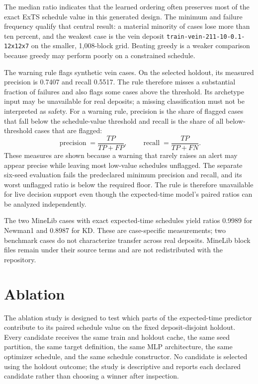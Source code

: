 \documentclass[11pt]{article}
\begin{document}
The median ratio indicates that the learned ordering often preserves most of the exact ExTS schedule value in this generated design. The minimum and failure frequency qualify that central result: a material minority of cases lose more than ten percent, and the weakest case is the vein deposit \texttt{train-vein-211-10-0.1-12x12x7} on the smaller, 1,008-block grid. Beating greedy is a weaker comparison because greedy may perform poorly on a constrained schedule.

The warning rule flags synthetic vein cases. On the selected holdout, its measured precision is 0.7407 and recall 0.5517. The rule therefore misses a substantial fraction of failures and also flags some cases above the threshold. Its archetype input may be unavailable for real deposits; a missing classification must not be interpreted as safety. For a warning rule, precision is the share of flagged cases that fall below the schedule-value threshold and recall is the share of all below-threshold cases that are flagged:
\begin{equation}
\operatorname{precision}=\frac{TP}{TP+FP},\qquad
\operatorname{recall}=\frac{TP}{TP+FN}.
\label{eq:warning-metrics}
\end{equation}
These measures are shown because a warning that rarely raises an alert may appear precise while leaving most low-value schedules unflagged. The separate six-seed evaluation fails the predeclared minimum precision and recall, and its worst unflagged ratio is below the required floor. The rule is therefore unavailable for live decision support even though the expected-time model's paired ratios can be analyzed independently.

The two MineLib cases with exact expected-time schedules yield ratios 0.9989 for Newman1 and 0.8987 for KD. These are case-specific measurements; two benchmark cases do not characterize transfer across real deposits. MineLib block files remain under their source terms and are not redistributed with the repository.

\section{Ablation}
The ablation study is designed to test which parts of the expected-time predictor contribute to its paired schedule value on the fixed deposit-disjoint holdout. Every candidate receives the same train and holdout cache, the same seed partition, the same target definition, the same MLP architecture, the same optimizer schedule, and the same schedule constructor. No candidate is selected using the holdout outcome; the study is descriptive and reports each declared candidate rather than choosing a winner after inspection.
\end{document}
